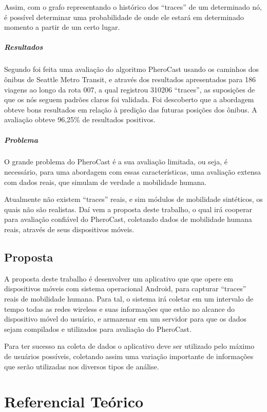 \documentclass[12pt, %
openright, 
oneside,
a4paper,
brazil]{facom-ufu-abntex2}
\begin{document}
Assim, com o grafo representando o histórico dos ``traces'' de um determinado nó, é possível determinar uma probabilidade de onde ele estará em determinado momento a partir de um certo lugar.

\paragraph{Resultados}
Segundo \cite{fynn} foi feita uma avaliação do algoritmo PheroCast usando os caminhos dos ônibus de Seattle Metro Transit, e através dos resultados apresentados para 186 viagens ao longo da rota 007, a qual registrou 310206 ``traces'', as suposições de que os nós seguem padrões claros foi validada. Foi descoberto que a abordagem obteve bons resultados em relação à predição das futuras posições dos ônibus. A avaliação obteve 96,25\% de resultados positivos. 


\paragraph{Problema}
O grande problema do PheroCast é a sua avaliação limitada, ou seja, é necessário, para uma abordagem com essas características, uma avaliação extensa com dados reais, que simulam de verdade a mobilidade humana. 

Atualmente não existem ``traces'' reais, e sim módulos de mobilidade sintéticos, os quais não são realistas. Daí vem a proposta deste trabalho, o qual irá cooperar para avaliação confiável do PheroCast, coletando dados de mobilidade humana reais, através de seus dispositivos móveis.

\section{Proposta}
A proposta deste trabalho é desenvolver um aplicativo que que opere em dispositivos móveis com sistema operacional Android, para capturar ``traces'' reais de mobilidade humana. Para tal, o sistema irá coletar em um intervalo de tempo todas as redes wireless e suas informações que estão no alcance do dispositivo móvel do usuário, e armazenar em um servidor para que os dados sejam compilados e utilizados para avaliação do PheroCast.

Para ter sucesso na coleta de dados o aplicativo deve ser utilizado pelo máximo de usuários possíveis, coletando assim uma variação importante de informações que serão utilizadas nos diversos tipos de análise. 


\chapter{Referencial Teórico}
\end{document}
